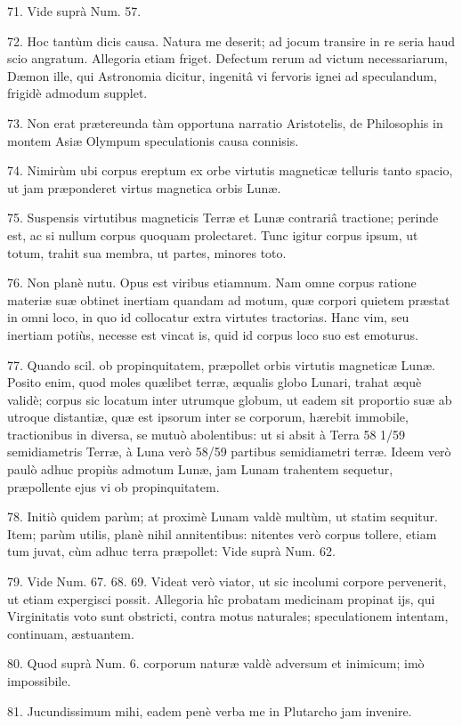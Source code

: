 \documentclass[a4paper, 11pt, oneside, polutonikogreek, german]{article}
\begin{document}
71. Vide suprà Num. 57.

72. Hoc tantùm dicis causa. Natura me deserit; ad jocum transire in re seria haud scio angratum. Allegoria etiam friget. Defectum rerum ad victum necessariarum, Dæmon ille, qui Astronomia dicitur, ingenitâ vi fervoris ignei ad speculandum, frigidè admodum supplet.

73. Non erat prætereunda tàm opportuna narratio Aristotelis, de Philosophis in montem Asiæ Olympum speculationis causa connisis.

74. Nimirùm ubi corpus ereptum ex orbe virtutis magneticæ telluris tanto spacio, ut jam præponderet virtus magnetica orbis Lunæ.

75. Suspensis virtutibus magneticis Terræ et Lunæ contrariâ tractione; perinde est, ac si nullum corpus quoquam prolectaret. Tunc igitur corpus ipsum, ut totum, trahit sua membra, ut partes, minores toto.

76. Non planè nutu. Opus est viribus etiamnum. Nam omne corpus ratione materiæ suæ obtinet inertiam quandam ad motum, quæ corpori quietem præstat in omni loco, in quo id collocatur extra virtutes tractorias. Hanc vim, seu inertiam potiùs, necesse est vincat is, quid id corpus loco suo est emoturus.

77. Quando scil. ob propinquitatem, præpollet orbis virtutis magneticæ Lunæ. Posito enim, quod moles quælibet terræ, æqualis globo Lunari, trahat æquè validè; corpus sic locatum inter utrumque globum, ut eadem sit proportio suæ ab utroque distantiæ, quæ est ipsorum inter se corporum, hærebit immobile, tractionibus in diversa, se mutuò abolentibus: ut si absit à Terra 58 1/59 semidiametris Terræ, à Luna verò 58/59 partibus semidiametri terræ. Ideem verò paulò adhuc propiùs admotum Lunæ, jam Lunam trahentem sequetur, præpollente ejus vi ob propinquitatem.

78. Initiò quidem parùm; at proximè Lunam valdè multùm, ut statim sequitur. Item; parùm utilis, planè nihil annitentibus: nitentes verò corpus tollere, etiam tum juvat, cùm adhuc terra præpollet: Vide suprà Num. 62.

79. Vide Num. 67. 68. 69. Videat verò viator, ut sic incolumi corpore pervenerit, ut etiam expergisci possit. Allegoria hîc probatam medicinam propinat ijs, qui Virginitatis voto sunt obstricti, contra motus naturales; speculationem intentam, continuam, æstuantem.

80. Quod suprà Num. 6. corporum naturæ valdè adversum et inimicum; imò impossibile.

81. Jucundissimum mihi, eadem penè verba me in Plutarcho jam invenire.
\end{document}
